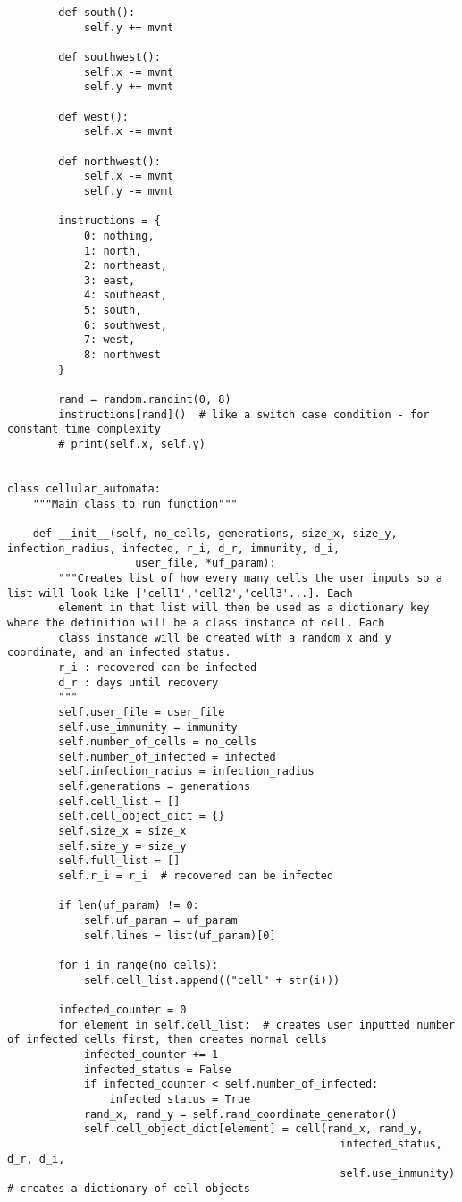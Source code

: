 \documentclass[11pt, a4paper]{article}
\begin{document}
\begin{lstlisting}
        def south():
            self.y += mvmt

        def southwest():
            self.x -= mvmt
            self.y += mvmt

        def west():
            self.x -= mvmt

        def northwest():
            self.x -= mvmt
            self.y -= mvmt

        instructions = {
            0: nothing,
            1: north,
            2: northeast,
            3: east,
            4: southeast,
            5: south,
            6: southwest,
            7: west,
            8: northwest
        }

        rand = random.randint(0, 8)
        instructions[rand]()  # like a switch case condition - for constant time complexity
        # print(self.x, self.y)


class cellular_automata:
    """Main class to run function"""

    def __init__(self, no_cells, generations, size_x, size_y, infection_radius, infected, r_i, d_r, immunity, d_i,
                    user_file, *uf_param):
        """Creates list of how every many cells the user inputs so a list will look like ['cell1','cell2','cell3'...]. Each
        element in that list will then be used as a dictionary key where the definition will be a class instance of cell. Each
        class instance will be created with a random x and y coordinate, and an infected status.
        r_i : recovered can be infected
        d_r : days until recovery
        """
        self.user_file = user_file
        self.use_immunity = immunity
        self.number_of_cells = no_cells
        self.number_of_infected = infected
        self.infection_radius = infection_radius
        self.generations = generations
        self.cell_list = []
        self.cell_object_dict = {}
        self.size_x = size_x
        self.size_y = size_y
        self.full_list = []
        self.r_i = r_i  # recovered can be infected

        if len(uf_param) != 0:
            self.uf_param = uf_param
            self.lines = list(uf_param)[0]

        for i in range(no_cells):
            self.cell_list.append(("cell" + str(i)))

        infected_counter = 0
        for element in self.cell_list:  # creates user inputted number of infected cells first, then creates normal cells
            infected_counter += 1
            infected_status = False
            if infected_counter < self.number_of_infected:
                infected_status = True
            rand_x, rand_y = self.rand_coordinate_generator()
            self.cell_object_dict[element] = cell(rand_x, rand_y,
                                                    infected_status, d_r, d_i,
                                                    self.use_immunity)  # creates a dictionary of cell objects


\end{lstlisting}
\end{document}
